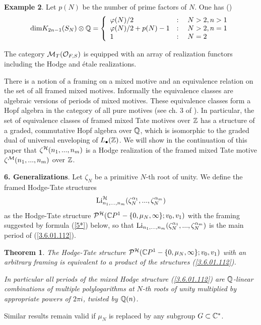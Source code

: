 \documentclass[10pt]{article}
\newtheorem{theorem}{Theorem}[section]
\begin{document}
{\bf Example 2}. Let $p(N)$  be the number of prime factors of $N$. One has (\cite{Bo})
\begin{equation} \label{kgt}
{\rm dim} K_{2n-1}(S_N)\otimes {\mathbb Q} = 
\left\{ \begin{array}{ll}
\varphi(N)/2 &: \quad N>2, n >1
\\ 
\varphi(N)/2  +p(N)-1 &: \quad N>2, n =1 
\\
1 & : \quad N=2\end{array}\right.
\end{equation}


The category ${\cal M}_{T}({\cal O}_{F, S})$ is equipped with an array of 
realization functors including the Hodge and \'etale realizations. 


There is a  notion of a 
framing on a mixed motive and  an equivalence relation on the set of all 
framed  mixed motives.  Informally  the equivalence classes are 
algebraic versions of  periods of mixed motives. These equivalence classes 
 form a Hopf algebra in the category of all pure motives (see ch. 3 of \cite{G9}). 
In particular, the set of equivalence classes of  
framed mixed Tate motives over ${\mathbb Z}$ 
has a structure of a graded, commutative Hopf algebra over ${\mathbb Q}$, which is  
isomorphic to the graded dual of universal enveloping of ${   L}_{\bullet}({\mathbb Z})$. 
We will show in the continuation of this   paper that 
$\zeta^{\cal H}(n_1, ..., n_m)$ is a Hodge realization of 
the framed  mixed Tate motive $\zeta^{\cal M}(n_1, ..., n_m)$ over ${\mathbb Z}$. 

{\bf 6. Generalizations}. Let $\zeta_N$ be a primitive $N$-th root of unity. We define the framed Hodge-Tate structures
\begin{equation} \label{3.6.01.112}
{\rm Li}^{\cal H}_{n_1, ..., n_m}(\zeta_N^{\alpha_1}, ..., \zeta_N^{\alpha_m})
\end{equation}
as the  Hodge-Tate structure ${\cal P}^{\cal H}({\mathbb C} P^1 - \{0, \mu_N, \infty\}; v_0, v_1)$ 
with the  framing suggested by formula (\ref{5*}) below, so that  
${\rm Li}_{n_1, ..., n_m}(\zeta_N^{\alpha_1}, ..., \zeta_N^{\alpha_m})$ is the main period 
of (\ref{3.6.01.112}). 


 \begin{theorem} \label{3.6.01.33} The Hodge-Tate structure 
${\cal P}^{\cal H}({\mathbb C} P^1 - \{0, \mu_N, \infty\}; v_0, v_1)$ with an arbitrary framing 
is equivalent to a product of the 
structures  (\ref{3.6.01.112}). 

In particular all periods of the mixed Hodge structure (\ref{3.6.01.112}) are  
${\mathbb Q}$-linear combinations 
of multiple polylogarithms at $N$-th roots of unity multiplied 
by appropriate powers of $2\pi i$, twisted by ${\mathbb Q}(n)$. 
\end{theorem}
Similar results remain valid if $\mu_N$ is replaced by any subgroup 
$G \subset {\mathbb C}^*$. 
\end{document}
